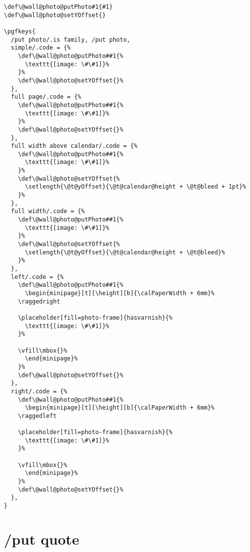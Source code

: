 \documentclass[11pt,oneside]{memoir-article}
\begin{document}
\begin{verbatim}
\def\@wall@photo@putPhoto#1{#1}
\def\@wall@photo@setYOffset{}

\pgfkeys{
  /put photo/.is family, /put photo,
  simple/.code = {%
    \def\@wall@photo@putPhoto##1{%
      \texttt{[image: \#\#1]}%
    }%
    \def\@wall@photo@setYOffset{}%
  },
  full page/.code = {%
    \def\@wall@photo@putPhoto##1{%
      \texttt{[image: \#\#1]}%
    }%
    \def\@wall@photo@setYOffset{}%
  },
  full width above calendar/.code = {%
    \def\@wall@photo@putPhoto##1{%
      \texttt{[image: \#\#1]}%
    }%
    \def\@wall@photo@setYOffset{%
      \setlength{\@t@yOffset}{\@t@calendar@height + \@t@bleed + 1pt}%
    }%
  },
  full width/.code = {%
    \def\@wall@photo@putPhoto##1{%
      \texttt{[image: \#\#1]}%
    }%
    \def\@wall@photo@setYOffset{%
      \setlength{\@t@yOffset}{\@t@calendar@height + \@t@bleed}%
    }%
  },
  left/.code = {%
    \def\@wall@photo@putPhoto##1{%
      \begin{minipage}[t][\height][b]{\calPaperWidth + 6mm}%
	\raggedright

	\placeholder[fill=photo-frame]{hasvarnish}{%
	  \texttt{[image: \#\#1]}%
	}%

	\vfill\mbox{}%
      \end{minipage}%
    }%
    \def\@wall@photo@setYOffset{}%
  },
  right/.code = {%
    \def\@wall@photo@putPhoto##1{%
      \begin{minipage}[t][\height][b]{\calPaperWidth + 6mm}%
	\raggedleft

	\placeholder[fill=photo-frame]{hasvarnish}{%
	  \texttt{[image: \#\#1]}%
	}%

	\vfill\mbox{}%
      \end{minipage}%
    }%
    \def\@wall@photo@setYOffset{}%
  },
}
\end{verbatim}

\section{/put quote}
\label{sec:orgf4134a9}
\end{document}
